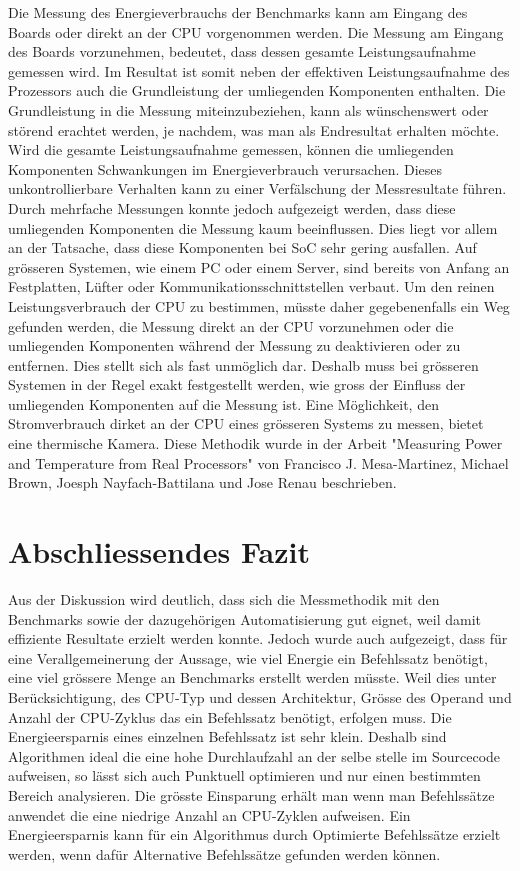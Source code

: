Die Messung des Energieverbrauchs der Benchmarks kann am Eingang des Boards oder direkt an der CPU vorgenommen werden. Die Messung am Eingang des Boards vorzunehmen, bedeutet, dass dessen gesamte Leistungsaufnahme gemessen wird. Im Resultat ist somit neben der effektiven Leistungsaufnahme des Prozessors auch die Grundleistung der umliegenden Komponenten enthalten. Die Grundleistung in die Messung miteinzubeziehen, kann als wünschenswert oder störend erachtet werden, je nachdem, was man als Endresultat erhalten möchte. Wird die gesamte Leistungsaufnahme gemessen, können die umliegenden Komponenten Schwankungen im Energieverbrauch verursachen. Dieses unkontrollierbare Verhalten kann zu einer Verfälschung der Messresultate führen. Durch mehrfache Messungen konnte jedoch aufgezeigt werden, dass diese umliegenden Komponenten die Messung kaum beeinflussen. Dies liegt vor allem an der Tatsache, dass diese Komponenten bei SoC sehr gering ausfallen. Auf grösseren Systemen, wie einem PC oder einem Server, sind bereits von Anfang an Festplatten, Lüfter oder Kommunikationsschnittstellen verbaut. Um den reinen Leistungsverbrauch der CPU zu bestimmen, müsste daher gegebenenfalls ein Weg gefunden werden, die Messung direkt an der CPU vorzunehmen oder die umliegenden Komponenten während der Messung zu deaktivieren oder zu entfernen. Dies stellt sich als fast unmöglich dar. Deshalb muss bei grösseren Systemen in der Regel exakt festgestellt werden, wie gross der Einfluss der umliegenden Komponenten auf die Messung ist. Eine Möglichkeit, den Stromverbrauch dirket an der CPU eines grösseren Systems zu messen, bietet eine thermische Kamera. Diese Methodik wurde in der Arbeit "Measuring Power and Temperature from Real Processors"\cite{measuring_power_temperature,} von Francisco J. Mesa-Martinez, Michael Brown, Joesph Nayfach-Battilana und Jose Renau beschrieben.


\section{Abschliessendes Fazit}
Aus der Diskussion wird deutlich, dass sich die Messmethodik mit den Benchmarks sowie der dazugehörigen Automatisierung gut eignet, weil damit effiziente Resultate erzielt werden konnte. Jedoch wurde auch aufgezeigt, dass für eine Verallgemeinerung der Aussage, wie viel Energie ein Befehlssatz benötigt, eine viel grössere Menge an Benchmarks erstellt werden müsste. Weil dies unter Berücksichtigung, des CPU-Typ und dessen Architektur, Grösse des Operand und Anzahl der CPU-Zyklus das ein Befehlssatz benötigt, erfolgen muss. Die Energieersparnis eines einzelnen Befehlssatz ist sehr klein. Deshalb sind Algorithmen ideal die eine hohe Durchlaufzahl an der selbe stelle im Sourcecode aufweisen, so lässt sich auch Punktuell optimieren und nur einen bestimmten Bereich analysieren. Die grösste Einsparung erhält man wenn man Befehlssätze anwendet die eine niedrige Anzahl an CPU-Zyklen aufweisen. Ein Energieersparnis kann für ein Algorithmus durch Optimierte Befehlssätze erzielt werden, wenn dafür Alternative Befehlssätze gefunden werden können.
